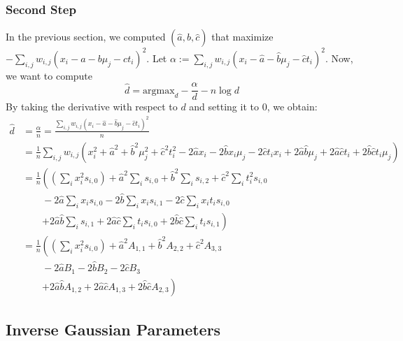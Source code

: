 \documentclass{article}
\begin{document}
\subsubsection{Second Step}

In the previous section, we computed $(\hat{a}, \hat{b}, \hat{c})$ that maximize $- \sum_{i,j} w_{i,j} \left( x_i - a - b \mu_j - c t_i \right)^2$. Let $\alpha := \sum_{i,j} w_{i,j} \left( x_i - \hat{a} - \hat{b} \mu_j - \hat{c} t_i \right)^2$. Now, we want to compute
\[
\hat{d} = \mathrm{argmax}_d - \frac{\alpha}{d} - n \log d
\]
By taking the derivative with respect to $d$ and setting it to 0, we obtain:
\begin{align*}
\hat{d} & = \frac{\alpha}{n} = \frac{\sum_{i,j} w_{i,j} \left( x_i - \hat{a} - \hat{b} \mu_j - \hat{c} t_i \right)^2}{n}
\\
& = \frac{1}{n} \sum_{i,j} w_{i,j} \left(
x^2_i
+ \hat{a}^2
+ \hat{b}^2 \mu^2_j
+ \hat{c}^2 t^2_i
- 2 \hat{a} x_i
- 2 \hat{b} x_i \mu_j
- 2 \hat{c} t_i x_i
+ 2 \hat{a} \hat{b} \mu_j
+ 2 \hat{a} \hat{c} t_i
+ 2 \hat{b} \hat{c} t_i \mu_j
\right)
\\
& = \frac{1}{n} \left(
\left( \sum_i x_i^2 s_{i,0} \right)
+ \hat{a}^2 \sum_i s_{i,0}
+ \hat{b}^2 \sum_i s_{i,2}
+ \hat{c}^2 \sum_i t^2_i s_{i,0}
\right.
\\
& \qquad
- 2 \hat{a} \sum_i x_i s_{i,0}
- 2 \hat{b} \sum_i x_i s_{i,1}
- 2 \hat{c} \sum_i x_i t_i s_{i,0}
\\
& \qquad
\left.
+ 2 \hat{a} \hat{b} \sum_i s_{i,1}
+ 2 \hat{a} \hat{c} \sum_i t_i s_{i,0}
+ 2 \hat{b} \hat{c} \sum_i t_i s_{i,1}
\right)
\\
& = \frac{1}{n} \left(
\left( \sum_i x_i^2 s_{i,0} \right)
+ \hat{a}^2 A_{1,1}
+ \hat{b}^2 A_{2,2}
+ \hat{c}^2 A_{3,3}
\right.
\\
& \qquad
- 2 \hat{a} B_1
- 2 \hat{b} B_2
- 2 \hat{c} B_3
\\
& \qquad
\left.
+ 2 \hat{a} \hat{b} A_{1,2}
+ 2 \hat{a} \hat{c} A_{1,3}
+ 2 \hat{b} \hat{c} A_{2,3}
\right)
\end{align*}

\subsection{Inverse Gaussian Parameters}
\end{document}
